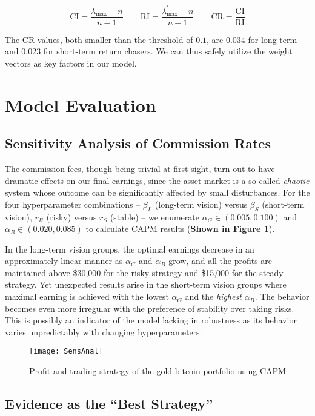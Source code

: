 \documentclass{mcmthesis}
\begin{document}
	\[ \mathrm{CI}=\frac{\lambda_{\max}-n}{n-1} \qquad \mathrm{RI}=\frac{\lambda^{\prime}_{\max}-n}{n-1} \qquad
	\mathrm{CR}=\frac{\mathrm{CI}}{\mathrm{RI}} \]
	
	The $ \mathrm{CR}$ values, both smaller than the threshold of $0.1$, are $0.034$ for long-term and $0.023$ for short-term return chasers. We can thus safely utilize the weight vectors as key factors in our model. 
	
	\section{Model Evaluation}
	\subsection{Sensitivity Analysis of Commission Rates}
	
	The commission fees, though being trivial at first sight, turn out to have dramatic effects on our final earnings, since the asset market is a so-called \textit{chaotic} system whose outcome can be significantly affected by small disturbances. For the four hyperparameter combinations -- $\beta_L$ (long-term vision) versus $\beta_S$ (short-term vision), $r_R$ (risky) versus $r_S$ (stable) -- we enumerate $\alpha_G \in \left( 0.005, 0.100 \right)$ and $\alpha_B \in \left( 0.020, 0.085 \right)$ to calculate CAPM results (\textbf{Shown in Figure \ref{fig:14}}). 
	
	In the long-term vision groups, the optimal earnings decrease in an approximately linear manner as $\alpha_G$ and $\alpha_B$ grow, and all the profits are maintained above \$30,000 for the risky strategy and \$15,000 for the steady strategy. Yet unexpected results arise in the short-term vision groups where maximal earning is achieved with the lowest $\alpha_G$ and the \textit{highest} $\alpha_B$. The behavior becomes even more irregular with the preference of stability over taking risks. This is possibly an indicator of the model lacking in robustness as its behavior varies unpredictably with changing hyperparameters. 
	
	\begin{figure}[h]
		\label {fig:14}
		\centering \texttt{[image: SensAnal]}
		\caption{Profit and trading strategy of the gold-bitcoin portfolio using CAPM}
	\end{figure}
	
	\subsection{Evidence as the ``Best Strategy''}
	
\end{document}
